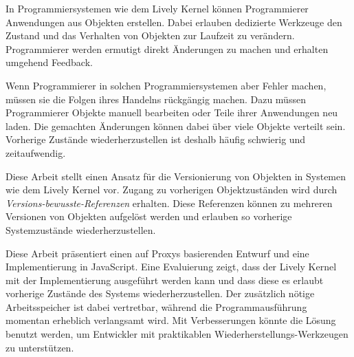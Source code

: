 \begin{zusammenfassung}

In Programmiersystemen wie dem Lively Kernel können Programmierer Anwendungen aus Objekten erstellen.
Dabei erlauben dedizierte Werkzeuge den Zustand und das Verhalten von Objekten zur Laufzeit zu verändern.
Programmierer werden ermutigt direkt Änderungen zu machen und erhalten umgehend Feedback.

Wenn Programmierer in solchen Programmiersystemen aber Fehler machen, müssen sie die Folgen ihres Handelns rückgängig machen.
Dazu müssen Programmierer Objekte manuell bearbeiten oder Teile ihrer Anwendungen neu laden.
Die gemachten Änderungen können dabei über viele Objekte verteilt sein.
Vorherige Zustände wiederherzustellen ist deshalb häufig schwierig und zeitaufwendig.

Diese Arbeit stellt einen Ansatz für die Versionierung von Objekten in Systemen wie dem Lively Kernel vor.
Zugang zu vorherigen Objektzuständen wird durch \emph{Versions-bewusste-Referenzen} erhalten.
Diese Referenzen können zu mehreren Versionen von Objekten aufgelöst werden und erlauben so vorherige Systemzustände wiederherzustellen.

Diese Arbeit präsentiert einen auf Proxys basierenden Entwurf und eine Implementierung in JavaScript.
Eine Evaluierung zeigt, dass der Lively Kernel mit der Implementierung ausgeführt werden kann und dass diese es erlaubt vorherige Zustände des Systems wiederherzustellen.
Der zusätzlich nötige Arbeitsspeicher ist dabei vertretbar, während die Programmausführung momentan erheblich verlangsamt wird.
Mit Verbesserungen könnte die Lösung benutzt werden, um Entwickler mit praktikablen Wiederherstellungs-Werkzeugen zu unterstützen.

\end{zusammenfassung}

